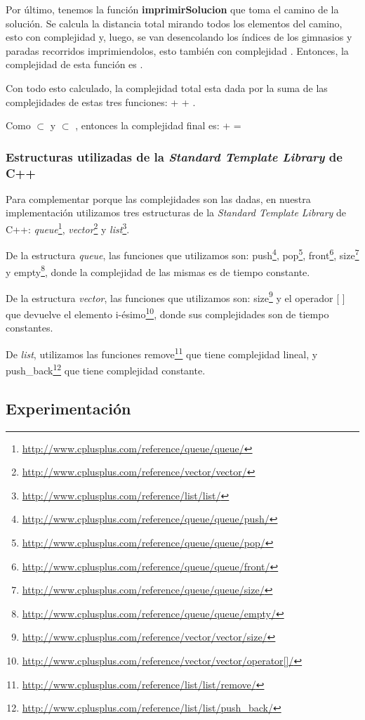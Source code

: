 Por último, tenemos la función \textbf{imprimirSolucion} que toma el camino de la solución. Se calcula la distancia total mirando todos los elementos del camino, esto con complejidad  y, luego, se van desencolando los índices de los gimnasios y paradas recorridos imprimiendolos, esto también con complejidad . Entonces, la complejidad de esta función es .


Con todo esto calculado, la complejidad total esta dada por la suma de las complejidades de estas tres funciones:  +  + . 

Como  $\subset$  y  $\subset$ , entonces la complejidad final es:  +  = 

\subsubsection{Estructuras utilizadas de la \textit{Standard Template Library} de C++}

Para complementar porque las complejidades son las dadas, en nuestra implementación utilizamos tres estructuras de la \textit{Standard Template Library} de C++: \emph{queue}\footnote{\url{http://www.cplusplus.com/reference/queue/queue/}}, \emph{vector}\footnote{\url{http://www.cplusplus.com/reference/vector/vector/}} y \emph{list}\footnote{\url{http://www.cplusplus.com/reference/list/list/}}.

De la estructura \emph{queue}, las funciones que utilizamos son: push\footnote{\url{http://www.cplusplus.com/reference/queue/queue/push/}}, pop\footnote{\url{http://www.cplusplus.com/reference/queue/queue/pop/}}, front\footnote{\url{http://www.cplusplus.com/reference/queue/queue/front/}}, size\footnote{\url{http://www.cplusplus.com/reference/queue/queue/size/}} y empty\footnote{\url{http://www.cplusplus.com/reference/queue/queue/empty/}}, donde la complejidad de las mismas es de tiempo constante.

De la estructura \emph{vector}, las funciones que utilizamos son: size\footnote{\url{http://www.cplusplus.com/reference/vector/vector/size/}} y el operador [ ] que devuelve el elemento i-ésimo\footnote{\url{http://www.cplusplus.com/reference/vector/vector/operator[]/}}, donde sus complejidades son de tiempo constantes.

De \emph{list}, utilizamos las funciones remove\footnote{\url{http://www.cplusplus.com/reference/list/list/remove/}} que tiene complejidad lineal, y push\_back\footnote{\url{http://www.cplusplus.com/reference/list/list/push_back/}} que tiene complejidad constante.


\subsection{Experimentación}

